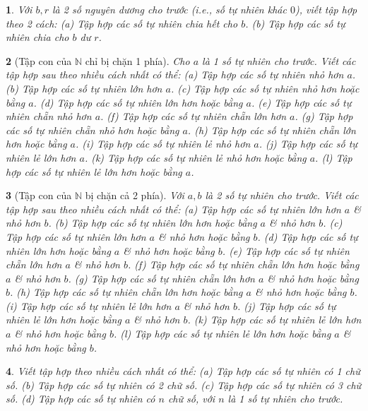 \documentclass{article}
\newtheorem{baitoan}{}
\begin{document}
\begin{baitoan}
	Với $b,r$ là 2 số nguyên dương cho trước (i.e., số tự nhiên khác $0$), viết tập hợp theo 2 cách: (a) Tập hợp các số tự nhiên chia hết cho $b$. (b) Tập hợp các số tự nhiên chia cho $b$ dư $r$.
\end{baitoan}

\begin{baitoan}[Tập con của $\mathbb{N}$ chỉ bị chặn 1 phía]
	Cho $a$ là 1 số tự nhiên cho trước. Viết các tập hợp sau theo nhiều cách nhất có thể: (a) Tập hợp các số tự nhiên nhỏ hơn $a$. (b) Tập hợp các số tự nhiên lớn hơn $a$. (c) Tập hợp các số tự nhiên nhỏ hơn hoặc bằng $a$. (d) Tập hợp các số tự nhiên lớn hơn hoặc bằng $a$. (e) Tập hợp các số tự nhiên chẵn nhỏ hơn $a$. (f) Tập hợp các số tự nhiên chẵn lớn hơn $a$. (g) Tập hợp các số tự nhiên chẵn nhỏ hơn hoặc bằng $a$. (h) Tập hợp các số tự nhiên chẵn lớn hơn hoặc bằng $a$. (i) Tập hợp các số tự nhiên lẻ nhỏ hơn $a$. (j) Tập hợp các số tự nhiên lẻ lớn hơn $a$. (k) Tập hợp các số tự nhiên lẻ nhỏ hơn hoặc bằng $a$. (l) Tập hợp các số tự nhiên lẻ lớn hơn hoặc bằng $a$.
\end{baitoan}

\begin{baitoan}[Tập con của $\mathbb{N}$ bị chặn cả 2 phía]
	Với $a,b$ là 2 số tự nhiên cho trước. Viết các tập hợp sau theo nhiều cách nhất có thể: (a) Tập hợp các số tự nhiên lớn hơn $a$ \& nhỏ hơn $b$. (b) Tập hợp các số tự nhiên lớn hơn hoặc bằng $a$ \& nhỏ hơn $b$. (c) Tập hợp các số tự nhiên lớn hơn $a$ \& nhỏ hơn hoặc bằng $b$. (d) Tập hợp các số tự nhiên lớn hơn hoặc bằng $a$ \& nhỏ hơn hoặc bằng $b$. (e) Tập hợp các số tự nhiên chẵn lớn hơn $a$ \& nhỏ hơn $b$. (f) Tập hợp các số tự nhiên chẵn lớn hơn hoặc bằng $a$ \& nhỏ hơn $b$. (g) Tập hợp các số tự nhiên chẵn lớn hơn $a$ \& nhỏ hơn hoặc bằng $b$. (h) Tập hợp các số tự nhiên chẵn lớn hơn hoặc bằng $a$ \& nhỏ hơn hoặc bằng $b$. (i) Tập hợp các số tự nhiên lẻ lớn hơn $a$ \& nhỏ hơn $b$. (j) Tập hợp các số tự nhiên lẻ lớn hơn hoặc bằng $a$ \& nhỏ hơn $b$. (k) Tập hợp các số tự nhiên lẻ lớn hơn $a$ \& nhỏ hơn hoặc bằng $b$. (l) Tập hợp các số tự nhiên lẻ lớn hơn hoặc bằng $a$ \& nhỏ hơn hoặc bằng $b$.
\end{baitoan}

\begin{baitoan}
	Viết tập hợp theo nhiều cách nhất có thể: (a) Tập hợp các số tự nhiên có 1 chữ số. (b) Tập hợp các số tự nhiên có 2 chữ số. (c) Tập hợp các số tự nhiên có 3 chữ số. (d) Tập hợp các số tự nhiên có $n$ chữ số, với $n$ là 1 số tự nhiên cho trước.
\end{baitoan}
\end{document}

